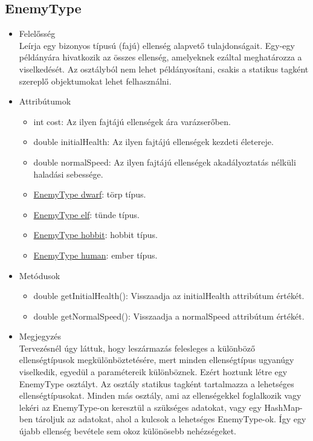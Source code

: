 \subsection{EnemyType}
\begin{itemize}
\item Felelősség\\
Leírja egy bizonyos típusú (fajú) ellenség alapvető tulajdonságait. Egy-egy példányára hivatkozik az összes ellenség, amelyeknek ezáltal meghatározza a viselkedését. Az osztályból nem lehet példányosítani, csakis a statikus tagként szereplő objektumokat lehet felhasználni.
\item Attribútumok
	\begin{itemize}
		\item int cost: Az ilyen fajtájú ellenségek ára varázserőben.
		\item double initialHealth: Az ilyen fajtájú ellenségek kezdeti életereje.
		\item double normalSpeed: Az ilyen fajtájú ellenségek akadályoztatás nélküli haladási sebessége.
		\item \underline{EnemyType dwarf}: törp típus.
		\item \underline{EnemyType elf}: tünde típus.
		\item \underline{EnemyType hobbit}: hobbit típus.
		\item \underline{EnemyType human}: ember típus.
	\end{itemize}
\item Metódusok
	\begin{itemize}
		\item double getInitialHealth(): Visszaadja az initialHealth attribútum értékét.
		\item double getNormalSpeed(): Visszaadja a normalSpeed attribútum értékét.
	\end{itemize}
\item Megjegyzés \\
Tervezésnél úgy láttuk, hogy leszármazás felesleges a különböző ellenségtípusok megkülönböztetésére, mert minden ellenségtípus ugyanúgy viselkedik, egyedül a paramétereik különböznek. Ezért hoztunk létre egy EnemyType osztályt. Az osztály statikus tagként tartalmazza a lehetséges ellenségtípusokat. Minden más osztály, ami az ellenségekkel foglalkozik vagy lekéri az EnemyType-on keresztül a szükséges adatokat, vagy egy HashMap-ben tároljuk az adatokat, ahol a kulcsok a lehetséges EnemyType-ok. Így egy újabb ellenség bevétele sem okoz különösebb nehézségeket.
\end{itemize}




